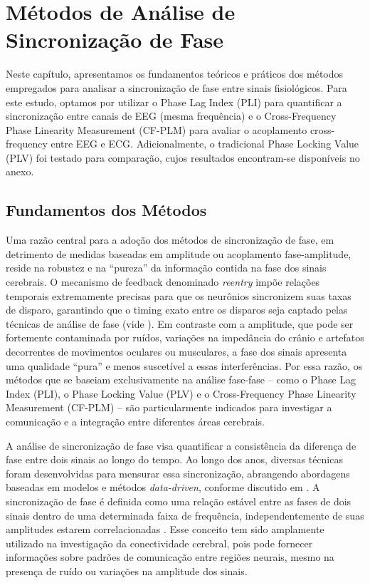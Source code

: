 \chapter{Métodos de Análise de Sincronização de Fase}
\label{chap:6_metodos_de_analise_de_sincronizacao_de_fase}

Neste capítulo, apresentamos os fundamentos teóricos e práticos dos métodos empregados para analisar a sincronização de fase entre sinais fisiológicos. Para este estudo, optamos por utilizar o Phase Lag Index (PLI) para quantificar a sincronização entre canais de EEG (mesma frequência) e o Cross-Frequency Phase Linearity Measurement (CF-PLM) para avaliar o acoplamento cross-frequency entre EEG e ECG. Adicionalmente, o tradicional Phase Locking Value (PLV) foi testado para comparação, cujos resultados encontram-se disponíveis no anexo.

\section{Fundamentos dos Métodos}

Uma razão central para a adoção dos métodos de sincronização de fase, em detrimento de medidas baseadas em amplitude ou acoplamento fase-amplitude, reside na robustez e na “pureza” da informação contida na fase dos sinais cerebrais. O mecanismo de feedback denominado \emph{reentry} impõe relações temporais extremamente precisas para que os neurônios sincronizem suas taxas de disparo, garantindo que o timing exato entre os disparos seja captado pelas técnicas de análise de fase (vide \cite{seraj2018cerebral, ren2022multi}). Em contraste com a amplitude, que pode ser fortemente contaminada por ruídos, variações na impedância do crânio e artefatos decorrentes de movimentos oculares ou musculares, a fase dos sinais apresenta uma qualidade “pura” e menos suscetível a essas interferências. Por essa razão, os métodos que se baseiam exclusivamente na análise fase-fase – como o Phase Lag Index (PLI), o Phase Locking Value (PLV) e o Cross-Frequency Phase Linearity Measurement (CF-PLM) – são particularmente indicados para investigar a comunicação e a integração entre diferentes áreas cerebrais.

A análise de sincronização de fase visa quantificar a consistência da diferença de fase entre dois sinais ao longo do tempo. Ao longo dos anos, diversas técnicas foram desenvolvidas para mensurar essa sincronização, abrangendo abordagens baseadas em modelos e métodos \textit{data-driven}, conforme discutido em \cite{seraj2018cerebral}. A sincronização de fase é definida como uma relação estável entre as fases de dois sinais dentro de uma determinada faixa de frequência, independentemente de suas amplitudes estarem correlacionadas \cite{seraj2018cerebral}. Esse conceito tem sido amplamente utilizado na investigação da conectividade cerebral, pois pode fornecer informações sobre padrões de comunicação entre regiões neurais, mesmo na presença de ruído ou variações na amplitude dos sinais.

